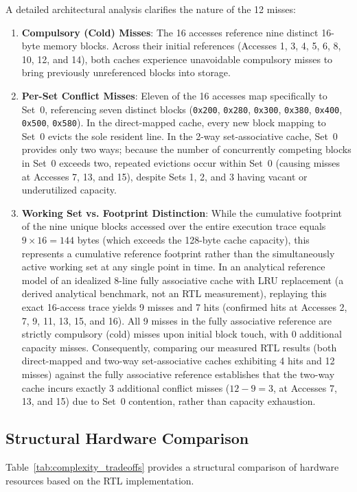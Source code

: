 \documentclass[conference]{IEEEtran}
\begin{document}
A detailed architectural analysis clarifies the nature of the 12 misses:
\begin{enumerate}
    \item \textbf{Compulsory (Cold) Misses}: The 16 accesses reference nine distinct 16-byte memory blocks. Across their initial references (Accesses 1, 3, 4, 5, 6, 8, 10, 12, and 14), both caches experience unavoidable compulsory misses to bring previously unreferenced blocks into storage.
    \item \textbf{Per-Set Conflict Misses}: Eleven of the 16 accesses map specifically to Set~0, referencing seven distinct blocks (\texttt{0x200}, \texttt{0x280}, \texttt{0x300}, \texttt{0x380}, \texttt{0x400}, \texttt{0x500}, \texttt{0x580}). In the direct-mapped cache, every new block mapping to Set~0 evicts the sole resident line. In the 2-way set-associative cache, Set~0 provides only two ways; because the number of concurrently competing blocks in Set~0 exceeds two, repeated evictions occur within Set~0 (causing misses at Accesses 7, 13, and 15), despite Sets 1, 2, and 3 having vacant or underutilized capacity.
    \item \textbf{Working Set vs. Footprint Distinction}: While the cumulative footprint of the nine unique blocks accessed over the entire execution trace equals $9 \times 16 = 144$ bytes (which exceeds the 128-byte cache capacity), this represents a cumulative reference footprint rather than the simultaneously active working set at any single point in time. In an analytical reference model of an idealized 8-line fully associative cache with LRU replacement (a derived analytical benchmark, not an RTL measurement), replaying this exact 16-access trace yields 9 misses and 7 hits (confirmed hits at Accesses 2, 7, 9, 11, 13, 15, and 16). All 9 misses in the fully associative reference are strictly compulsory (cold) misses upon initial block touch, with 0 additional capacity misses. Consequently, comparing our measured RTL results (both direct-mapped and two-way set-associative caches exhibiting 4 hits and 12 misses) against the fully associative reference establishes that the two-way cache incurs exactly 3 additional conflict misses ($12 - 9 = 3$, at Accesses 7, 13, and 15) due to Set~0 contention, rather than capacity exhaustion.
\end{enumerate}

\subsection{Structural Hardware Comparison}
Table~\ref{tab:complexity_tradeoffs} provides a structural comparison of hardware resources based on the RTL implementation.
\end{document}
